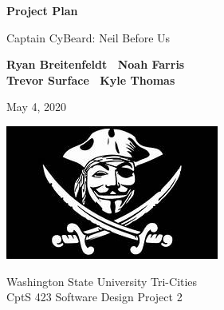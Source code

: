 \begin{titlepage}
    \begin{center}
        \vspace*{1cm}

        \Huge
        \textbf{Project Plan}

        \vspace{.5cm}
        \LARGE
        Captain CyBeard: Neil Before Us

        \vspace{1cm}

        \textbf{Ryan Breitenfeldt \textbar\ Noah Farris\\ Trevor Surface \textbar\ Kyle Thomas}

        \vspace{.2cm}
        \Large
        May 4, 2020

        \vspace{2cm}
        \includegraphics[scale=1]{logo}

        \vfill

        Washington State University Tri-Cities\\
        CptS 423 Software Design Project 2

    \end{center}
\end{titlepage}

